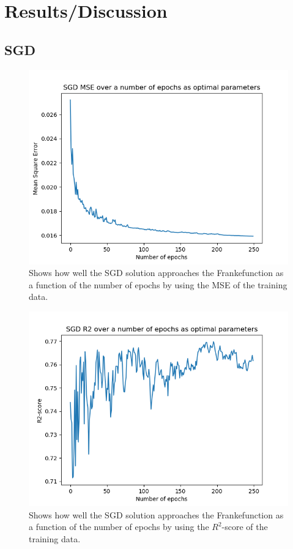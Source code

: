 \documentclass[a4paper, UKenglish]{article}
\newcommand{\0}{\mathbf{0}}
\newcommand{\1}{\mathbf{1}}
\begin{document}
\section{Results/Discussion}


\subsection{SGD} 
\begin{figure}[H]
        \centering 
        \includegraphics[scale=0.7]{images/partA_MSE.png} 
        \caption{Shows how well the SGD solution approaches the Frankefunction as a function of the number of epochs by using the MSE of the training data.}
        \label{fig:partA_MSE}
\end{figure}


\begin{figure}[H]
        \centering 
        \includegraphics[scale=0.7]{images/partA_R2.png} 
        \caption{Shows how well the SGD solution approaches the Frankefunction as a function of the number of epochs by using the $R^2$-score of the training data.}
        \label{fig:partA_R2}
\end{figure}
\end{document}
